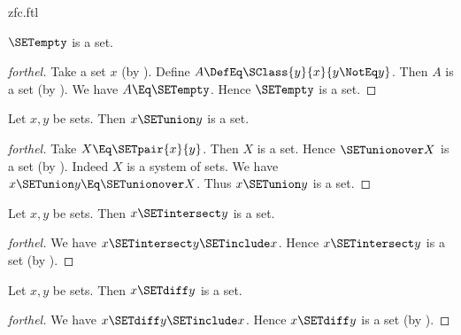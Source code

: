 \documentclass{stex}
\begin{document}
\begin{smodule}{zfc.ftl}

\begin{proposition}[forthel]
  $\SETempty$ is a set.
\end{proposition}
\begin{proof}[forthel]
  Take a set $x$ (by ).
  Define $A \DefEq \SClass{y}{x}{y \NotEq y}$.
  Then $A$ is a set (by ).
  We have $A \Eq \SETempty$.
  Hence $\SETempty$ is a set.
\end{proof}

\begin{proposition}[forthel]
  Let $x, y$ be sets.
  Then $x \SETunion y$ is a set.
\end{proposition}
\begin{proof}[forthel]
  Take $X \Eq \SETpair{x}{y}$.
  Then $X$ is a set.
  Hence $\SETunionover X$ is a set (by ).
  Indeed $X$ is a system of sets.
  We have $x \SETunion y \Eq \SETunionover X$.
  Thus $x \SETunion y$ is a set.
\end{proof}

\begin{proposition}[forthel]
  Let $x, y$ be sets.
  Then $x \SETintersect y$ is a set.
\end{proposition}
\begin{proof}[forthel]
  We have $x \SETintersect y \SETinclude x$.
  Hence $x \SETintersect y$ is a set (by ).
\end{proof}

\begin{proposition}[forthel]
  Let $x, y$ be sets.
  Then $x \SETdiff y$ is a set.
\end{proposition}
\begin{proof}[forthel]
  We have $x \SETdiff y \SETinclude x$.
  Hence $x \SETdiff y$ is a set (by ).
\end{proof}


\end{smodule}
\end{document}
